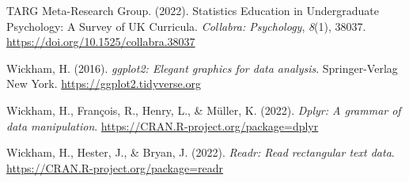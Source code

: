\documentclass[
  man,floatsintext]{apa6}
\newlength{\cslhangindent}
\newlength{\cslentryspacingunit} %
\newenvironment{CSLReferences}[2] %
 {%
  \setlength{\parindent}{0pt}
  \ifodd #1
  \let\oldpar\par
  \def\par{\hangindent=\cslhangindent\oldpar}
  \fi
  \setlength{\parskip}{#2\cslentryspacingunit}
 }%
 {}
\begin{document}
\begin{CSLReferences}{1}{0}
\leavevmode{}%
TARG Meta-Research Group. (2022). Statistics {Education} in {Undergraduate} {Psychology}: {A} {Survey} of {UK} {Curricula}. \emph{Collabra: Psychology}, \emph{8}(1), 38037. \url{https://doi.org/10.1525/collabra.38037}

\leavevmode{}%
Wickham, H. (2016). \emph{ggplot2: Elegant graphics for data analysis}. Springer-Verlag New York. \url{https://ggplot2.tidyverse.org}

\leavevmode{}%
Wickham, H., François, R., Henry, L., \& Müller, K. (2022). \emph{Dplyr: A grammar of data manipulation}. \url{https://CRAN.R-project.org/package=dplyr}

\leavevmode{}%
Wickham, H., Hester, J., \& Bryan, J. (2022). \emph{Readr: Read rectangular text data}. \url{https://CRAN.R-project.org/package=readr}

\end{CSLReferences}
\end{document}
